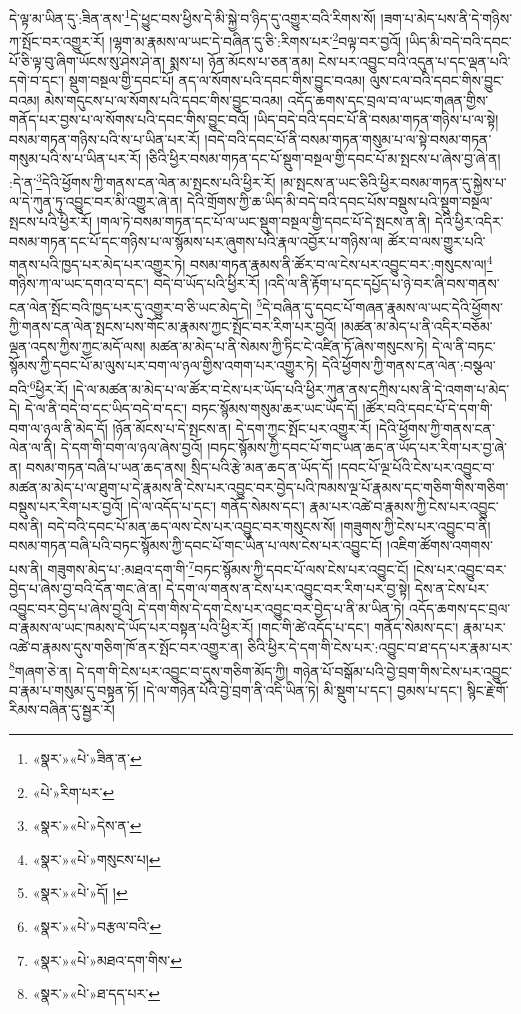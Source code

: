 དེ་ལྟ་མ་ཡིན་དུ་:ཟིན་ནས་\footnote{«སྣར་»«པེ་»ཟིན་ན་}དེ་ཕྱུང་བས་ཕྱིས་དེ་མི་སྐྱེ་བ་ཉིད་དུ་འགྱུར་བའི་རིགས་སོ། །ཟག་པ་མེད་པས་ནི་དེ་གཉིས་ཀ་སྤོང་བར་འགྱུར་རོ། །ལྷག་མ་རྣམས་ལ་ཡང་དེ་བཞིན་དུ་ཅི་:རིགས་པར་\footnote{«པེ་»རིག་པར་}བལྟ་བར་བྱའོ། །ཡིད་མི་བདེ་བའི་དབང་པོ་ཅི་ལྟ་བུ་ཞིག་ཡོངས་སུ་ཤེས་ཤེ་ན། སྨས་པ། ཉོན་མོངས་པ་ཅན་ནམ། ངེས་པར་འབྱུང་བའི་འདུན་པ་དང་ལྡན་པའི་དགེ་བ་དང་། སྡུག་བསྔལ་གྱི་དབང་པོ། ནད་ལ་སོགས་པའི་དབང་གིས་བྱུང་བའམ། ལུས་ངལ་བའི་དབང་གིས་བྱུང་བའམ། མེས་གདུངས་པ་ལ་སོགས་པའི་དབང་གིས་བྱུང་བའམ། འདོད་ཆགས་དང་བྲལ་བ་ལ་ཡང་གཞན་གྱིས་གནོད་པར་བྱས་པ་ལ་སོགས་པའི་དབང་གིས་བྱུང་བའོ། །ཡིད་བདེ་བའི་དབང་པོ་ནི་བསམ་གཏན་གཉིས་པ་ལ་སྟེ། བསམ་གཏན་གཉིས་པའི་ས་པ་ཡིན་པར་རོ། །བདེ་བའི་དབང་པོ་ནི་བསམ་གཏན་གསུམ་པ་ལ་སྟེ་བསམ་གཏན་གསུམ་པའི་ས་པ་ཡིན་པར་རོ། །ཅིའི་ཕྱིར་བསམ་གཏན་དང་པོ་སྡུག་བསྔལ་གྱི་དབང་པོ་མ་སྤངས་པ་ཞེས་བྱ་ཞེ་ན། :དེ་ན་\footnote{«སྣར་»«པེ་»དེས་ན་}དེའི་ཕྱོགས་ཀྱི་གནས་ངན་ལེན་མ་སྤངས་པའི་ཕྱིར་རོ། །མ་སྤངས་ན་ཡང་ཅིའི་ཕྱིར་བསམ་གཏན་དུ་སྐྱེས་པ་ལ་དེ་ཀུན་ཏུ་འབྱུང་བར་མི་འགྱུར་ཞེ་ན། དེའི་གྲོགས་ཀྱི་ཆ་ཡིད་མི་བདེ་བའི་དབང་པོས་བསྡུས་པའི་སྡུག་བསྔལ་སྤངས་པའི་ཕྱིར་རོ། །གལ་ཏེ་བསམ་གཏན་དང་པོ་ལ་ཡང་སྡུག་བསྔལ་གྱི་དབང་པོ་དེ་སྤངས་ན་ནི། དེའི་ཕྱིར་འདིར་བསམ་གཏན་དང་པོ་དང་གཉིས་པ་ལ་སྙོམས་པར་ཞུགས་པའི་རྣལ་འབྱོར་པ་གཉིས་ལ། ཚོར་བ་ལས་གྱུར་པའི་གནས་པའི་ཁྱད་པར་མེད་པར་འགྱུར་ཏེ། བསམ་གཏན་རྣམས་ནི་ཚོར་བ་ལ་ངེས་པར་འབྱུང་བར་:གསུངས་ལ།\footnote{«སྣར་»«པེ་»གསུངས་པ།} གཉིས་ཀ་ལ་ཡང་དགའ་བ་དང་། བདེ་བ་ཡོད་པའི་ཕྱིར་རོ། །འདི་ལ་ནི་རྟོག་པ་དང་དཔྱོད་པ་ཉེ་བར་ཞི་བས་གནས་ངན་ལེན་སྤོང་བའི་ཁྱད་པར་དུ་འགྱུར་བ་ཅི་ཡང་མེད་དེ། \footnote{«སྣར་»«པེ་»དོ། ། }དེ་བཞིན་དུ་དབང་པོ་གཞན་རྣམས་ལ་ཡང་དེའི་ཕྱོགས་ཀྱི་གནས་ངན་ལེན་སྤངས་པས་གོང་མ་རྣམས་ཀྱང་སྤོང་བར་རིག་པར་བྱའོ། །མཚན་མ་མེད་པ་ནི་འདིར་བཅོམ་ལྡན་འདས་ཀྱིས་ཀྱང་མདོ་ལས། མཚན་མ་མེད་པ་ནི་སེམས་ཀྱི་ཏིང་ངེ་འཛིན་ཏོ་ཞེས་གསུངས་ཏེ། དེ་ལ་ནི་བཏང་སྙོམས་ཀྱི་དབང་པོ་མ་ལུས་པར་བག་ལ་ཉལ་གྱིས་འགག་པར་འགྱུར་ཏེ། དེའི་ཕྱོགས་ཀྱི་གནས་ངན་ལེན་:བསྩལ་བའི་\footnote{«སྣར་»«པེ་»བརྩལ་བའི་}ཕྱིར་རོ། །དེ་ལ་མཚན་མ་མེད་པ་ལ་ཚོར་བ་ངེས་པར་ཡོད་པའི་ཕྱིར་ཀུན་ནས་དཀྲིས་པས་ནི་དེ་འགག་པ་མེད་དེ། དེ་ལ་ནི་བདེ་བ་དང་ཡིད་བདེ་བ་དང་། བཏང་སྙོམས་གསུམ་ཆར་ཡང་ཡོད་དོ། །ཚོར་བའི་དབང་པོ་དེ་དག་གི་བག་ལ་ཉལ་ནི་མེད་དོ། །ཉོན་མོངས་པ་དེ་སྤངས་ན། དེ་དག་ཀྱང་སྤོང་པར་འགྱུར་རོ། །དེའི་ཕྱོགས་ཀྱི་གནས་ངན་ལེན་ལ་ནི། དེ་དག་གི་བག་ལ་ཉལ་ཞེས་བྱའོ། །བཏང་སྙོམས་ཀྱི་དབང་པོ་གང་ཡན་ཆད་ན་ཡོད་པར་རིག་པར་བྱ་ཞེ་ན། བསམ་གཏན་བཞི་པ་ཡན་ཆད་ནས། སྲིད་པའི་རྩེ་མན་ཆད་ན་ཡོད་དོ། །དབང་པོ་ལྔ་པོའི་ངེས་པར་འབྱུང་བ་མཚན་མ་མེད་པ་ལ་ཐུག་པ་དེ་རྣམས་ནི་ངེས་པར་འབྱུང་བར་བྱེད་པའི་ཁམས་ལྔ་པོ་རྣམས་དང་གཅིག་གིས་གཅིག་བསྡུས་པར་རིག་པར་བྱའོ། །དེ་ལ་འདོད་པ་དང་། གནོད་སེམས་དང་། རྣམ་པར་འཚེ་བ་རྣམས་ཀྱི་ངེས་པར་འབྱུང་བས་ནི། བདེ་བའི་དབང་པོ་མན་ཆད་ལས་ངེས་པར་འབྱུང་བར་གསུངས་སོ། །གཟུགས་ཀྱི་ངེས་པར་འབྱུང་བ་ནི། བསམ་གཏན་བཞི་པའི་བཏང་སྙོམས་ཀྱི་དབང་པོ་གང་ཡིན་པ་ལས་ངེས་པར་འབྱུང་ངོ། །འཇིག་ཚོགས་འགགས་པས་ནི། གཟུགས་མེད་པ་:མཐའ་དག་གི་\footnote{«སྣར་»«པེ་»མཐའ་དག་གིས་}བཏང་སྙོམས་ཀྱི་དབང་པོ་ལས་ངེས་པར་འབྱུང་ངོ། །ངེས་པར་འབྱུང་བར་བྱེད་པ་ཞེས་བྱ་བའི་དོན་གང་ཞེ་ན། དེ་དག་ལ་གནས་ན་ངེས་པར་འབྱུང་བར་རིག་པར་བྱ་སྟེ། དེས་ན་ངེས་པར་འབྱུང་བར་བྱེད་པ་ཞེས་བྱའི། དེ་དག་གིས་དེ་དག་ངེས་པར་འབྱུང་བར་བྱེད་པ་ནི་མ་ཡིན་ཏེ། འདོད་ཆགས་དང་བྲལ་བ་རྣམས་ལ་ཡང་ཁམས་དེ་ཡོད་པར་བསྟན་པའི་ཕྱིར་རོ། །གང་གི་ཚེ་འདོད་པ་དང་། གནོད་སེམས་དང་། རྣམ་པར་འཚེ་བ་རྣམས་དུས་གཅིག་ཁོ་ནར་སྤོང་བར་འགྱུར་ན། ཅིའི་ཕྱིར་དེ་དག་གི་ངེས་པར་:འབྱུང་བ་ཐ་དད་པར་རྣམ་པར་\footnote{«སྣར་»«པེ་»ཐ་དད་པར་}གཞག་ཅེ་ན། དེ་དག་གི་ངེས་པར་འབྱུང་བ་དུས་གཅིག་མོད་ཀྱི། གཉེན་པོ་བསྒོམ་པའི་བྱེ་བྲག་གིས་ངེས་པར་འབྱུང་བ་རྣམ་པ་གསུམ་དུ་བསྟན་ཏོ། །དེ་ལ་གཉེན་པོའི་བྱེ་བྲག་ནི་འདི་ཡིན་ཏེ། མི་སྡུག་པ་དང་། བྱམས་པ་དང་། སྙིང་རྗེ་གོ་རིམས་བཞིན་དུ་སྦྱར་རོ། 